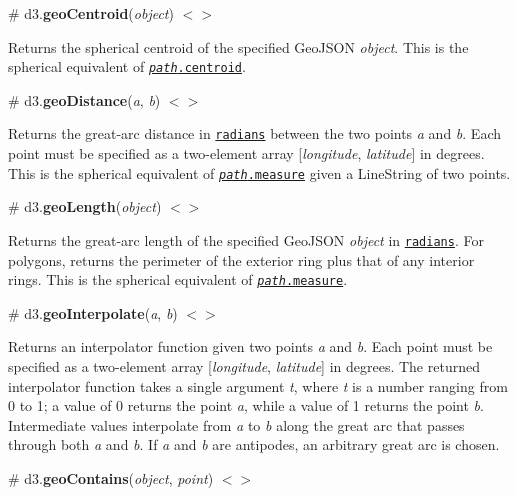 \label{_geoCentroid}%
\# d3.{\bfseries geo\+Centroid}({\itshape object}) \href{https://github.com/d3/d3-geo/blob/master/src/centroid.js}{\tt $<$$>$}

Returns the spherical centroid of the specified Geo\+J\+S\+ON {\itshape object}. This is the spherical equivalent of \href{#path_centroid}{\tt {\itshape path}.centroid}.

\label{_geoDistance}%
\# d3.{\bfseries geo\+Distance}({\itshape a}, {\itshape b}) \href{https://github.com/d3/d3-geo/blob/master/src/distance.js}{\tt $<$$>$}

Returns the great-\/arc distance in \href{http://mathworld.wolfram.com/Radian.html}{\tt radians} between the two points {\itshape a} and {\itshape b}. Each point must be specified as a two-\/element array \mbox{[}{\itshape longitude}, {\itshape latitude}\mbox{]} in degrees. This is the spherical equivalent of \href{#path_measure}{\tt {\itshape path}.measure} given a Line\+String of two points.

\label{_geoLength}%
\# d3.{\bfseries geo\+Length}({\itshape object}) \href{https://github.com/d3/d3-geo/blob/master/src/length.js}{\tt $<$$>$}

Returns the great-\/arc length of the specified Geo\+J\+S\+ON {\itshape object} in \href{http://mathworld.wolfram.com/Radian.html}{\tt radians}. For polygons, returns the perimeter of the exterior ring plus that of any interior rings. This is the spherical equivalent of \href{#path_measure}{\tt {\itshape path}.measure}.

\label{_geoInterpolate}%
\# d3.{\bfseries geo\+Interpolate}({\itshape a}, {\itshape b}) \href{https://github.com/d3/d3-geo/blob/master/src/interpolate.js}{\tt $<$$>$}

Returns an interpolator function given two points {\itshape a} and {\itshape b}. Each point must be specified as a two-\/element array \mbox{[}{\itshape longitude}, {\itshape latitude}\mbox{]} in degrees. The returned interpolator function takes a single argument {\itshape t}, where {\itshape t} is a number ranging from 0 to 1; a value of 0 returns the point {\itshape a}, while a value of 1 returns the point {\itshape b}. Intermediate values interpolate from {\itshape a} to {\itshape b} along the great arc that passes through both {\itshape a} and {\itshape b}. If {\itshape a} and {\itshape b} are antipodes, an arbitrary great arc is chosen.

\label{_geoContains}%
\# d3.{\bfseries geo\+Contains}({\itshape object}, {\itshape point}) \href{https://github.com/d3/d3-geo/blob/master/src/contains.js}{\tt $<$$>$}

